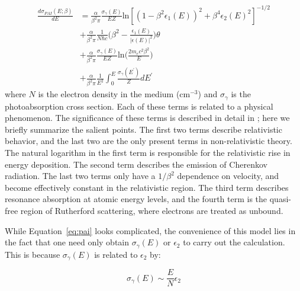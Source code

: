 \begin{equation}
\label{eq:pai}
\begin{split}
\frac{d\sigma_{PAI}(E; \beta)}{dE} &= \frac{\alpha}{\beta^{2} \pi} \frac{\sigma_{\gamma}(E)}{EZ} \mathrm{ln}[(1-\beta^{2}\epsilon_{1}(E))^{2} + \beta^{4}\epsilon_{2}(E)^{2}]^{-1/2} \\
&+ \frac{\alpha}{\beta^{2} \pi} \frac{1}{N \hbar c} \Big ( \beta^{2} - \frac{\epsilon_{1}(E)}{ | \epsilon(E) | ^{2}} \Big ) \theta \\
&+  \frac{\alpha}{\beta^{2} \pi} \frac{\sigma_{\gamma}(E)}{EZ} \mathrm{ln}\Big( \frac{2 m_{e}c^{2}\beta^{2}}{E} \Big) \\
&+  \frac{\alpha}{\beta^{2} \pi} \frac{1}{E^{2}} \int_{0}^{E} \frac{\sigma_{\gamma}(E^{\prime})}{Z} dE^{\prime} 
\end{split}
\end{equation}
where $N$ is the electron density in the medium (cm$^{-3}$) and $\sigma_{\gamma}$ is the photoabsorption cross section. Each of these terms is related to a physical phenomenon. The significance of these terms is described in detail in \cite{AllisonCobb:1980}; here we briefly summarize the salient points. The first two terms describe relativistic behavior, and the last two are the only present terms in non-relativistic theory. The natural logarithm in the first term is responsible for the relativistic rise in energy deposition. The second term describes the emission of Cherenkov radiation. The last two terms only have a $1/\beta^{2}$ dependence on velocity, and become effectively constant in the relativistic region. The third term describes resonance absorption at atomic energy levels, and the fourth term is the quasi-free region of Rutherford scattering, where electrons are treated as unbound.


While Equation~\ref{eq:pai} looks complicated, the convenience of this model lies in the fact that one need only obtain $\sigma_{\gamma}(E)$ or $\epsilon_{2}$ to carry out the calculation. This is because $\sigma_{\gamma}(E)$ is related to $\epsilon_{2}$ by:

\begin{equation}
\label{eq:sigma_gamma}
\sigma_{\gamma}(E) \sim \frac{E}{N} \epsilon_{2}
\end{equation}

